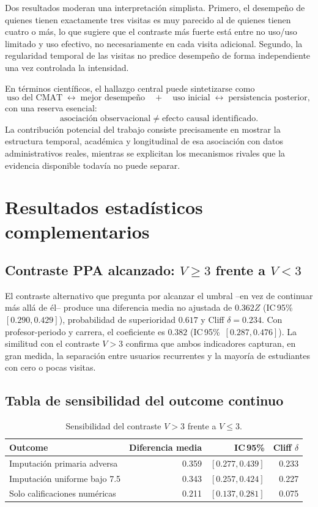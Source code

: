 \documentclass[11pt,letterpaper]{article}
\newcommand{\CI}{IC\,95\%}
\begin{document}
Dos resultados moderan una interpretación simplista. Primero, el desempeño de quienes tienen exactamente tres visitas es muy parecido al de quienes tienen cuatro o más, lo que sugiere que el contraste más fuerte está entre no uso/uso limitado y uso efectivo, no necesariamente en cada visita adicional. Segundo, la regularidad temporal de las visitas no predice desempeño de forma independiente una vez controlada la intensidad.

En términos científicos, el hallazgo central puede sintetizarse como
\[
\boxed{
\text{uso del CMAT}\;\longleftrightarrow\;\text{mejor desempeño}
\quad+\quad
\text{uso inicial}\;\longleftrightarrow\;\text{persistencia posterior},
}
\]
con una reserva esencial:
\[
\boxed{\text{asociación observacional}\neq\text{efecto causal identificado}.}
\]
La contribución potencial del trabajo consiste precisamente en mostrar la estructura temporal, académica y longitudinal de esa asociación con datos administrativos reales, mientras se explicitan los mecanismos rivales que la evidencia disponible todavía no puede separar.




\clearpage
\appendix
\section{Resultados estadísticos complementarios}

\subsection{Contraste PPA alcanzado: $V\geq3$ frente a $V<3$}

El contraste alternativo que pregunta por alcanzar el umbral --en vez de continuar más allá de él-- produce una diferencia media no ajustada de $0.362Z$ (\CI\ $[0.290,0.429]$), probabilidad de superioridad $0.617$ y Cliff $\delta=0.234$. Con profesor-periodo y carrera, el coeficiente es $0.382$ (\CI\ $[0.287,0.476]$). La similitud con el contraste $V>3$ confirma que ambos indicadores capturan, en gran medida, la separación entre usuarios recurrentes y la mayoría de estudiantes con cero o pocas visitas.

\subsection{Tabla de sensibilidad del outcome continuo}

\begin{table}[H]
\centering
\caption{Sensibilidad del contraste $V>3$ frente a $V\leq3$.}
\begin{tabular}{@{}lrrr@{}}
\toprule
\textbf{Outcome} & \textbf{Diferencia media} & \textbf{\CI} & \textbf{Cliff $\delta$} \\
\midrule
Imputación primaria adversa & 0.359 & $[0.277,0.439]$ & 0.233 \\
Imputación uniforme bajo 7.5 & 0.343 & $[0.257,0.424]$ & 0.227 \\
Solo calificaciones numéricas & 0.211 & $[0.137,0.281]$ & 0.075 \\
\bottomrule
\end{tabular}
\end{table}
\end{document}
